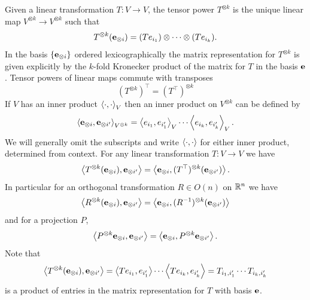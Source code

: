 Given a linear transformation $T : V \to V$, the tensor power $T^{\otimes k}$ is the unique linear map $V^{\otimes k} \to V^{\otimes k}$ such that
\[
  T^{\otimes k} (\bf{e}_{\otimes i}) 
  = (Te_{i_1}) \otimes \cdots \otimes (Te_{i_k}).
\]
In the basis $\{\bf{e}_{\otimes i}\}$ ordered lexicographically the matrix representation for $T^{\otimes k}$ is given explicitly by the $k$-fold Kronecker product of the matrix for $T$ in the basis $\bf{e}$.
Tensor powers of linear maps commute with transposes
\[
  (T^{\otimes k})^\top = (T^\top)^{\otimes k}
\]
If $V$ has an inner product $\inner{\cdot, \cdot}_V$ then an inner product on $V^{\otimes k}$ can be defined by
\[
  \inner{{\bf{e}}_{\otimes i}, {\bf{e}}_{\otimes i'}}_{V^{\otimes k}}
  = \inner{e_{i_1}, e_{i'_1}}_V \cdots \inner{e_{i_k}, e_{i'_k}}_V.
\]
We will generally omit the subscripts and write $\inner{\cdot,\cdot}$ for either inner product, determined from context. For any linear transformation $T : V \to V$ we have
\[
  \inner{T^{\otimes k} (\bf{e}_{\otimes i}), {\bf{e}}_{\otimes i'}} = \inner{\bf{e}_{\otimes i}, (T^{\top})^{\otimes k}(\bf{e}_{\otimes i'})}.
\]
In particular for an orthogonal transformation $R \in O(n)$ on $\RR^n$ we have
\[
  \inner{R^{\otimes k} (\bf{e}_{\otimes i}), \bf{e}_{\otimes i'}} = \inner{\bf{e}_{\otimes i}, (R^{-1})^{\otimes k}(\bf{e}_{\otimes i'})}
\]
and for a projection $P$,
\[
  \inner{P^{\otimes k} \bf{e}_{\otimes i}, \bf{e}_{\otimes i'}} = \inner{\bf{e}_{\otimes i}, P^{\otimes k}\bf{e}_{\otimes i'}}.
\]
Note that 
\[
  \inner{T^{\otimes k}(\bf{e}_{\otimes i}), \bf{e}_{\otimes i'}} = \inner{Te_{i_1}, e_{i'_1}} \cdots \inner{Te_{i_k}, e_{i'_k}} =
  T_{i_1, i'_1} \cdots T_{i_k, i'_k}
\] 
is a product of entries in the matrix representation for $T$ with basis $\bf{e}$.

